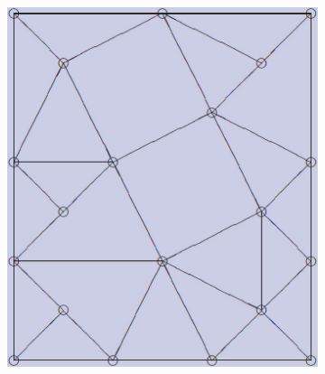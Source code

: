 \documentclass[12pt]{article}
\begin{document}
\begin{figure}[tb]
\begin{subfigure}[b]{0.2\textwidth}
      \caption{}\label{fig:contract_kernel4}
  \end{subfigure}

  \begin{subfigure}[b]{0.2\textwidth}
      \includegraphics[width=\textwidth]{img/contract_kernel6}
      \caption{}\label{fig:contract_kernel5}
  \end{subfigure}
  ~
  \begin{subfigure}[b]{0.2\textwidth}

\end{subfigure}
\end{figure}
\end{document}
